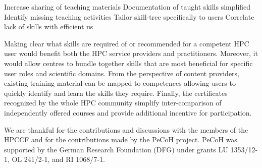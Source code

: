 \documentclass[jocse]{jocseart}
\newcommand{\jk}[1]{\todo[inline]{TODO: #1}}
\begin{document}
Increase sharing of teaching materials
Documentation of taught skills simplified
Identify missing teaching activities
Tailor skill-tree specifically to users
Correlate lack of skills with efficient us

Making clear what skills are required of or recommended for a competent HPC user would benefit both the HPC service providers and practitioners.
Moreover, it would allow centres to bundle together skills that are most beneficial for specific user roles and scientific domains.
From the perspective of content providers, existing training material can be mapped to competences allowing users to quickly identify and learn the skills they require.
Finally, the certificates recognized by the whole HPC community simplify inter-comparison of independently offered courses and provide additional incentive for participation.





\appendix

\begin{acks}
\small
We are thankful for the contributions and discussions with the members of the HPCCF and for the contributions made by the PeCoH project.
\jk{TODO}
PeCoH was supported by the German Research Foundation (DFG) under grants LU 1353/12-1, OL 241/2-1, and RI 1068/7-1.
\end{acks}



\end{document}
